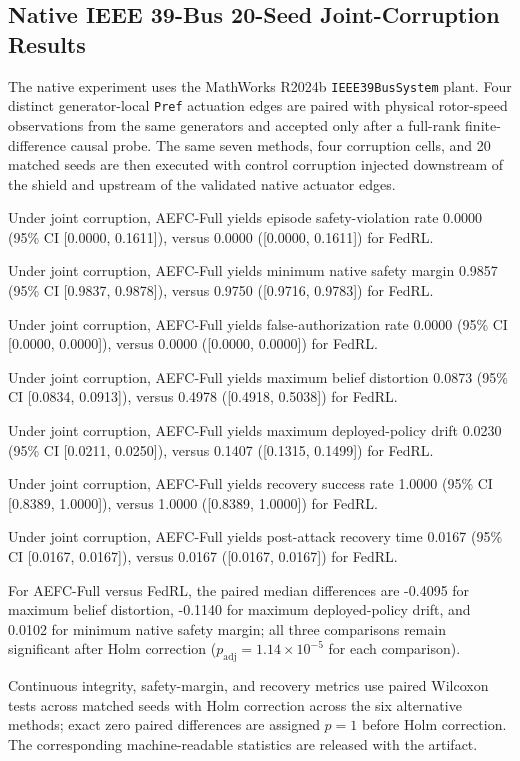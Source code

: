 \subsection{Native IEEE 39-Bus 20-Seed Joint-Corruption Results}

The native experiment uses the MathWorks R2024b \texttt{IEEE39BusSystem} plant. Four distinct generator-local \texttt{Pref} actuation edges are paired with physical rotor-speed observations from the same generators and accepted only after a full-rank finite-difference causal probe. The same seven methods, four corruption cells, and 20 matched seeds are then executed with control corruption injected downstream of the shield and upstream of the validated native actuator edges.



Under joint corruption, AEFC-Full yields episode safety-violation rate 0.0000 (95\% CI [0.0000, 0.1611]), versus 0.0000 ([0.0000, 0.1611]) for FedRL.

Under joint corruption, AEFC-Full yields minimum native safety margin 0.9857 (95\% CI [0.9837, 0.9878]), versus 0.9750 ([0.9716, 0.9783]) for FedRL.

Under joint corruption, AEFC-Full yields false-authorization rate 0.0000 (95\% CI [0.0000, 0.0000]), versus 0.0000 ([0.0000, 0.0000]) for FedRL.

Under joint corruption, AEFC-Full yields maximum belief distortion 0.0873 (95\% CI [0.0834, 0.0913]), versus 0.4978 ([0.4918, 0.5038]) for FedRL.

Under joint corruption, AEFC-Full yields maximum deployed-policy drift 0.0230 (95\% CI [0.0211, 0.0250]), versus 0.1407 ([0.1315, 0.1499]) for FedRL.

Under joint corruption, AEFC-Full yields recovery success rate 1.0000 (95\% CI [0.8389, 1.0000]), versus 1.0000 ([0.8389, 1.0000]) for FedRL.

Under joint corruption, AEFC-Full yields post-attack recovery time 0.0167 (95\% CI [0.0167, 0.0167]), versus 0.0167 ([0.0167, 0.0167]) for FedRL.

For AEFC-Full versus FedRL, the paired median differences are -0.4095 for maximum belief distortion, -0.1140 for maximum deployed-policy drift, and 0.0102 for minimum native safety margin; all three comparisons remain significant after Holm correction ($p_{\mathrm{adj}}=1.14\times10^{-5}$ for each comparison).

Continuous integrity, safety-margin, and recovery metrics use paired Wilcoxon tests across matched seeds with Holm correction across the six alternative methods; exact zero paired differences are assigned $p=1$ before Holm correction. The corresponding machine-readable statistics are released with the artifact.
